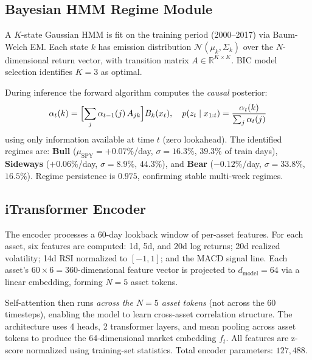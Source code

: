 \documentclass[sigconf,nonacm]{acmart}
\newcommand{\R}{\mathbb{R}}
\newcommand{\ft}{f_t}
\newcommand{\post}{p(z_t \mid x_{1:t})}
\begin{document}
\subsection{Bayesian HMM Regime Module}
\label{sec:hmm}
A $K$-state Gaussian HMM is fit on the training period (2000--2017) via
Baum-Welch EM.
Each state $k$ has emission distribution
$\mathcal{N}(\mu_k, \Sigma_k)$ over the $N$-dimensional return vector,
with transition matrix $A \in \R^{K \times K}$.
BIC model selection identifies $K=3$ as optimal.

During inference the forward algorithm computes the \emph{causal} posterior:
\begin{equation}
  \alpha_t(k) = \Bigl[\sum_j \alpha_{t-1}(j)\, A_{jk}\Bigr] B_k(x_t),
  \quad
  \post = \frac{\alpha_t(k)}{\sum_j \alpha_t(j)}
  \label{eq:forward}
\end{equation}
using only information available at time $t$ (zero lookahead).
The identified regimes are:
\textbf{Bull} ($\mu_{\text{SPY}}=+0.07\%$/day, $\sigma=16.3\%$, $39.3\%$ of
train days),
\textbf{Sideways} ($+0.06\%$/day, $\sigma=8.9\%$, $44.3\%$), and
\textbf{Bear} ($-0.12\%$/day, $\sigma=33.8\%$, $16.5\%$).
Regime persistence is $0.975$, confirming stable multi-week regimes.

\subsection{iTransformer Encoder}
\label{sec:encoder}
The encoder processes a 60-day lookback window of per-asset features.
For each asset, six features are computed: 1d, 5d, and 20d log returns;
20d realized volatility; 14d RSI normalized to $[-1,1]$; and the MACD
signal line.
Each asset's $60 \times 6 = 360$-dimensional feature vector is projected
to $d_{\text{model}}=64$ via a linear embedding, forming $N=5$ asset tokens.

Self-attention then runs \emph{across the $N=5$ asset tokens} (not across
the 60 timesteps), enabling the model to learn cross-asset correlation
structure.
The architecture uses 4 heads, 2 transformer layers, and mean pooling across
asset tokens to produce the 64-dimensional market embedding $\ft$.
All features are z-score normalized using training-set statistics.
Total encoder parameters: $127{,}488$.
\end{document}
